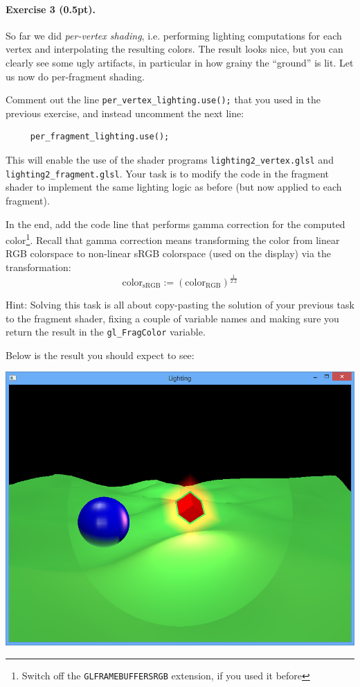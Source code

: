 \documentclass{article}
\newenvironment{exercise}[2]{\paragraph{Exercise #1 (#2pt).} }{
\medskip}
\begin{document}
\begin{exercise}{3}{0.5}
So far we did \emph{per-vertex shading}, i.e. performing lighting computations for each vertex and interpolating the resulting colors. The result looks nice, but you can clearly see some ugly artifacts, in particular in how grainy the ``ground'' is lit. Let us now do per-fragment shading.

\noindent
Comment out the line \verb#per_vertex_lighting.use();# that you used in the previous exercise, and instead uncomment the next line:
\begin{lstlisting}
	 per_fragment_lighting.use();     
\end{lstlisting}
This will enable the use of the shader programs \verb#lighting2_vertex.glsl# and \verb#lighting2_fragment.glsl#. Your task is to modify the code in the fragment shader to implement the same lighting logic as before (but now applied to each fragment). 

In the end, add the code line that performs gamma correction for the computed color\footnote{Switch off the \texttt{GL\textunderscore FRAMEBUFFER\textunderscore SRGB} extension, if you used it before}. Recall that gamma correction means transforming the color from linear RGB colorspace to non-linear sRGB colorspace (used on the display) via the transformation:
$$
\text{color}_\text{sRGB} := \left(\text{color}_\text{RGB}\right)^\frac{1}{2.2}
$$

Hint: Solving this task is all about copy-pasting the solution of your previous task to the fragment shader, fixing a couple of variable names and making sure you return the result in the \verb#gl_FragColor# variable.
\end{exercise}

Below is the result you should expect to see:
\begin{center}
\includegraphics[width=1.0\textwidth]{lighting2.png}
\end{center}
\end{document}
